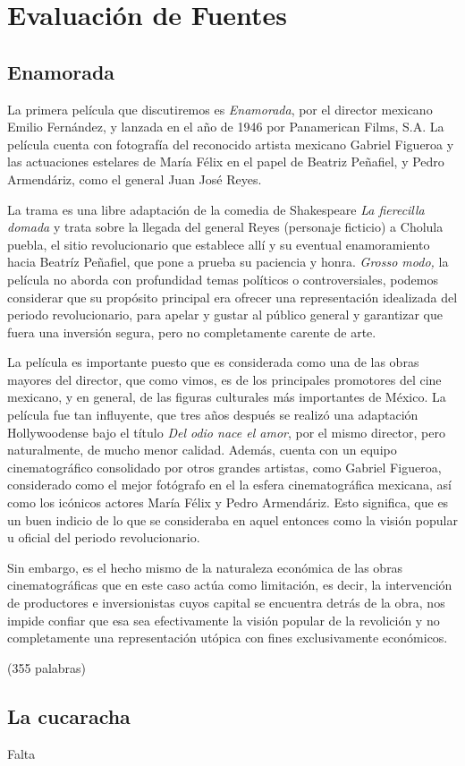 \section{Evaluación de Fuentes}
\subsection{Enamorada}
La primera película que discutiremos es \textit{Enamorada}\autocite{fernandez_enamorada_1946}, por el director mexicano Emilio Fernández, y lanzada en el año de 1946 por Panamerican Films, S.A. La película cuenta con fotografía del reconocido artista mexicano Gabriel Figueroa y las actuaciones estelares  de María Félix en el papel de Beatriz Peñafiel, y Pedro Armendáriz, como el general Juan José Reyes. 

La trama es una libre adaptación de la comedia de Shakespeare \textit{La fierecilla domada} y trata sobre la llegada del general Reyes (personaje ficticio) a Cholula puebla, el sitio revolucionario que establece allí y su eventual enamoramiento hacia Beatríz Peñafiel, que pone a prueba su paciencia y honra. \textit{Grosso modo,} la película no aborda con profundidad temas políticos o controversiales, podemos considerar que su propósito principal era ofrecer una representación idealizada del periodo revolucionario, para apelar y gustar al público general y garantizar que fuera una inversión segura, pero no completamente carente de arte. 

La película es importante puesto que es considerada como una de las obras mayores del director, que como vimos, es de los principales promotores del cine mexicano, y en general, de las figuras culturales más importantes de México. La película fue tan influyente, que tres años después se realizó una adaptación Hollywoodense bajo el título \textit{Del odio nace el amor}, por el mismo director, pero naturalmente, de mucho menor calidad. Además, cuenta con un equipo cinematográfico consolidado por otros grandes artistas, como Gabriel Figueroa, considerado como el mejor fotógrafo en el la esfera cinematográfica mexicana, así como los icónicos actores María Félix y Pedro Armendáriz. Esto significa, que es un buen indicio de lo que se consideraba en aquel entonces como la visión popular u oficial del periodo revolucionario. 

Sin embargo, es el hecho mismo de la naturaleza económica de las obras cinematográficas que en este caso actúa como limitación, es decir, la intervención de productores e inversionistas cuyos capital se encuentra detrás de la obra, nos impide confiar que esa sea efectivamente la visión popular de la revolición y no completamente una representación utópica con fines exclusivamente económicos.

(355 palabras)
\subsection{La cucaracha}
Falta

